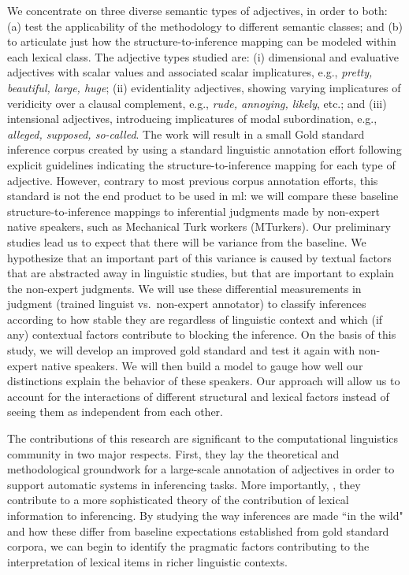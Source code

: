 \documentclass[10pt]{article}
\begin{document}
We concentrate on three diverse semantic types of adjectives, 
in order to both: (a) test the applicability of the methodology to different semantic classes; and (b) to articulate just how the structure-to-inference mapping can be modeled within each lexical class. The adjective types studied are: 
(i) dimensional and evaluative adjectives with scalar values and associated scalar implicatures, e.g., \textit{pretty, beautiful, large, huge}; (ii) evidentiality adjectives, showing varying implicatures of veridicity over a clausal complement, e.g., \textit{rude, annoying, likely}, etc.; and (iii) intensional adjectives, introducing implicatures of modal subordination, e.g., \textit{alleged, supposed, so-called}. The work will result in a small Gold standard inference  corpus created by using a standard linguistic annotation effort following explicit guidelines indicating the structure-to-inference mapping for each type of adjective. However, contrary to most previous corpus annotation efforts, this standard is not the end product to be used in {\sc ml}: we will compare these baseline structure-to-inference mappings to inferential judgments made by non-expert native speakers, such as Mechanical Turk workers (MTurkers). Our preliminary studies lead us to expect that there will be variance from the baseline. We hypothesize that an important part of this variance is caused by textual factors that are abstracted away in linguistic studies, but that are important to explain the non-expert judgments. We will use these differential measurements in judgment (trained linguist vs.\ non-expert annotator) 
to classify inferences according to how stable they are regardless of linguistic context and which (if any) contextual factors contribute to blocking the inference. On the basis of this study, we will develop an improved gold standard and test it again with non-expert native speakers. We will then build a model to gauge how well our distinctions explain the behavior of these speakers. Our approach will allow us to account for the interactions of different structural and lexical factors instead of seeing them as independent from each other. 

The contributions of this research are significant to the computational linguistics community in two major respects.  First, they lay the theoretical and  methodological groundwork for a large-scale annotation of adjectives in order to support automatic systems in inferencing tasks. More importantly, , they contribute to a more sophisticated theory of the contribution of lexical information to inferencing. By studying the way inferences are made ``in the wild" and how these differ from baseline expectations established from gold standard corpora, we can begin to identify the pragmatic factors contributing to the interpretation of lexical items in richer linguistic contexts.
\end{document}
